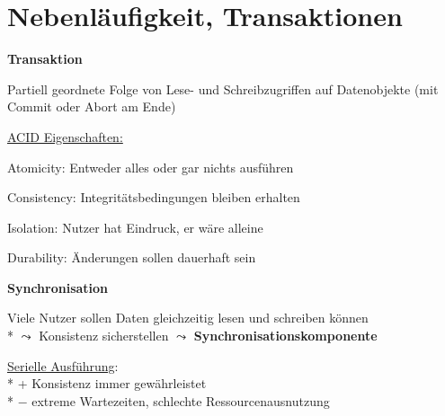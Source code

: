 \section{Nebenläufigkeit, Transaktionen}
\label{sec:parallel}

\textbf{Transaktion}
\begin{items}
	\item Partiell geordnete Folge von Lese- und Schreibzugriffen auf Datenobjekte (mit Commit oder Abort am Ende)
	\item \underline{ACID Eigenschaften:}
	\item Atomicity: Entweder alles oder gar nichts ausführen
	\item Consistency: Integritätsbedingungen bleiben erhalten
	\item Isolation: Nutzer hat Eindruck, er wäre alleine
	\item Durability: Änderungen sollen dauerhaft sein
\end{items}

\textbf{Synchronisation}
\begin{items}
	\item Viele Nutzer sollen Daten gleichzeitig lesen und schreiben können
		\\*
		\( \leadsto \) Konsistenz sicherstellen \( \leadsto \) \textbf{Synchronisationskomponente}
	\item \underline{Serielle Ausführung}: 
		\\*
		+ Konsistenz immer gewährleistet 
		\\*
		$-$ extreme Wartezeiten, schlechte Ressourcenausnutzung
\end{items}

